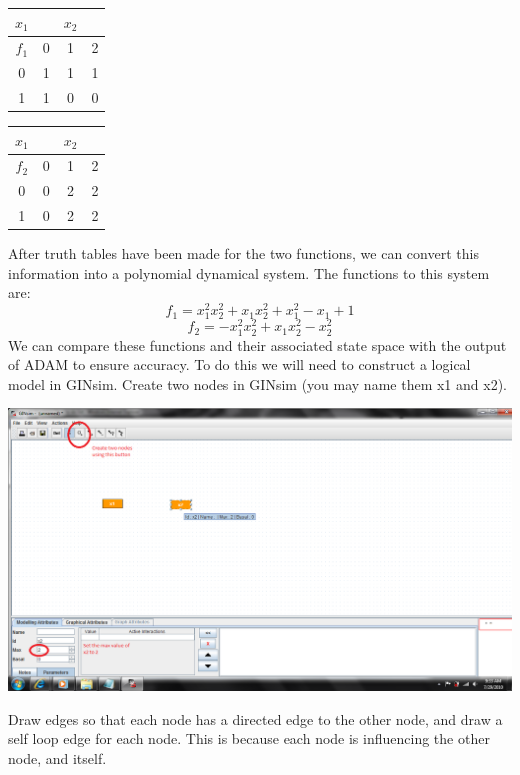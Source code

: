 \documentclass[12pt]{article}
\begin{document}
\begin{table}[ht]
\begin{minipage}[b]{0.5\linewidth}\centering
\begin{tabular}{|c|ccc}
	
$x_{1}$ & & $x_{2}$ \\
	\hline
 $f_{1}$& 0 & 1 & 2  \\
	\hline
0 & 1 & 1 & 1 \\
1 & 1 & 0 & 0 \\
	\hline
\end{tabular}
\end{minipage}
\hspace{0.5cm}
\begin{minipage}[b]{0.5\linewidth}
\centering
 
\begin{tabular}{|c|ccc}
	\hline
$x_{1}$ & & $x_{2}$ \\
	\hline
 $f_{2}$& 0 & 1 & 2  \\
	\hline
0 & 0 & 2 & 2 \\
1 & 0 & 2 & 2 \\
	\hline
\end{tabular}
\end{minipage}
\end{table}
After truth tables have been made for the two functions, we 
can convert this information into a polynomial dynamical system. The functions to this system 
are:
$$f_{1} = x_{1}^{2}x_{2}^{2}+x_{1}x_{2}^{2}+x_{1}^{2}-x_{1}+1$$
$$f_{2} = -x_{1}^{2}x_{2}^{2}+x_{1}x_{2}^{2}-x_{2}^{2}$$
We can compare these functions and their associated state space with the output of ADAM to 
ensure accuracy. To do this we will need to construct a logical model in GINsim. Create two 
nodes in GINsim (you may name them x1 and x2).
\begin{center}
\includegraphics[scale=.43]{createnodes.png}
\end{center}
 Draw edges so that each node has a directed 
edge to the other node, and draw a self loop edge for each node. This is because each node is 
influencing the other node, and itself.
\end{document}
